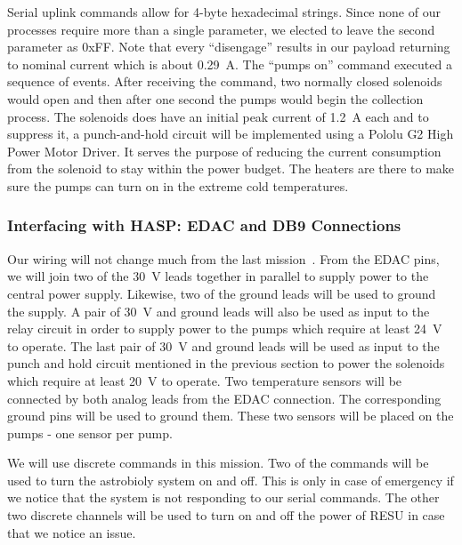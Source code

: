 Serial uplink commands allow for 4-byte hexadecimal strings.  Since none of our processes require more than a single parameter, we elected to leave the second parameter as 0xFF.  Note that every ``disengage'' results in our payload returning to nominal current which is about \SI{0.29}{\ampere}.  The ``pumps on'' command executed a sequence of events. After receiving the command, two normally closed solenoids would open and then after one second the pumps would begin the collection process.  The solenoids does have an initial peak current of \SI{1.2}{\ampere} each and to suppress it, a punch-and-hold circuit will be implemented using a Pololu G2 High Power Motor Driver.  It serves the purpose of reducing the current consumption from the solenoid to stay within the power budget.  The heaters are there to make sure the pumps can turn on in the extreme cold temperatures.  

\subsubsection{Interfacing with HASP: EDAC and DB9 Connections}

Our wiring will not change much from the last mission~\cite{SORA}.  From the EDAC pins, we will join two of the \SI{30}{\volt} leads together in parallel to supply power to the central power supply.  Likewise, two of the ground leads will be used to ground the supply.  A pair of \SI{30}{\volt} and ground leads will also be used as input to the relay circuit in order to supply power to the pumps which require at least \SI{24}{\volt} to operate.  The last pair of \SI{30}{\volt} and ground leads will be used as input to the punch and hold circuit mentioned in the previous section to power the solenoids which require at least \SI{20}{\volt} to operate.  Two temperature sensors will be connected by both analog leads from the EDAC connection.  The corresponding ground pins will be used to ground them.  These two sensors will be placed on the pumps - one sensor per pump.  

We will use discrete commands in this mission.  Two of the commands will be used to turn the astrobioly system on and off.  This is only in case of emergency if we notice that the system is not responding to our serial commands.  The other two discrete channels will be used to turn on and off the power of RESU in case that we notice an issue.

